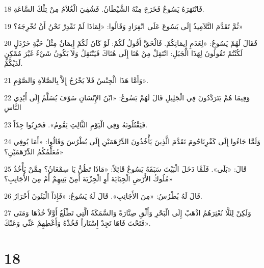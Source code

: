 \par 18 فَانْتَهَرَهُ يَسُوعُ فَخَرَجَ مِنْهُ الشَّيْطَانُ. فَشُفِيَ الْغُلاَمُ مِنْ تِلْكَ السَّاعَةِ.
\par 19 ثُمَّ تَقَدَّمَ التَّلاَمِيذُ إِلَى يَسُوعَ عَلَى انْفِرَادٍ وَقَالُوا: «لِمَاذَا لَمْ نَقْدِرْ نَحْنُ أَنْ نُخْرِجَهُ؟»
\par 20 فَقَالَ لَهُمْ يَسُوعُ: «لِعَدَمِ إِيمَانِكُمْ. فَالْحَقَّ أَقُولُ لَكُمْ: لَوْ كَانَ لَكُمْ إِيمَانٌ مِثْلُ حَبَّةِ خَرْدَلٍ لَكُنْتُمْ تَقُولُونَ لِهَذَا الْجَبَلِ: انْتَقِلْ مِنْ هُنَا إِلَى هُنَاكَ فَيَنْتَقِلُ وَلاَ يَكُونُ شَيْءٌ غَيْرَ مُمْكِنٍ لَدَيْكُمْ.
\par 21 وَأَمَّا هَذَا الْجِنْسُ فَلاَ يَخْرُجُ إِلاَّ بِالصَّلاَةِ وَالصَّوْمِ».
\par 22 وَفِيمَا هُمْ يَتَرَدَّدُونَ فِي الْجَلِيلِ قَالَ لَهُمْ يَسُوعُ: «ابْنُ الإِنْسَانِ سَوْفَ يُسَلَّمُ إِلَى أَيْدِي النَّاسِ
\par 23 فَيَقْتُلُونَهُ وَفِي الْيَوْمِ الثَّالِثِ يَقُومُ». فَحَزِنُوا جِدّاً.
\par 24 وَلَمَّا جَاءُوا إِلَى كَفْرِنَاحُومَ تَقَدَّمَ الَّذِينَ يَأْخُذُونَ الدِّرْهَمَيْنِ إِلَى بُطْرُسَ وَقَالُوا: «أَمَا يُوفِي مُعَلِّمُكُمُ الدِّرْهَمَيْنِ؟»
\par 25 قَالَ: «بَلَى». فَلَمَّا دَخَلَ الْبَيْتَ سَبَقَهُ يَسُوعُ قَائِلاً: «مَاذَا تَظُنُّ يَا سِمْعَانُ؟ مِمَّنْ يَأْخُذُ مُلُوكُ الأَرْضِ الْجِبَايَةَ أَوِ الْجِزْيَةَ أَمِنْ بَنِيهِمْ أَمْ مِنَ الأَجَانِبِ؟»
\par 26 قَالَ لَهُ بُطْرُسُ: «مِنَ الأَجَانِبِ». قَالَ لَهُ يَسُوعُ: «فَإِذاً الْبَنُونَ أَحْرَارٌ.
\par 27 وَلَكِنْ لِئَلَّا نُعْثِرَهُمُ اذْهَبْ إِلَى الْبَحْرِ وَأَلْقِ صِنَّارَةً وَالسَّمَكَةُ الَّتِي تَطْلُعُ أَوَّلاً خُذْهَا وَمَتَى فَتَحْتَ فَاهَا تَجِدْ إِسْتَاراً فَخُذْهُ وَأَعْطِهِمْ عَنِّي وَعَنْكَ».

\chapter{18}

